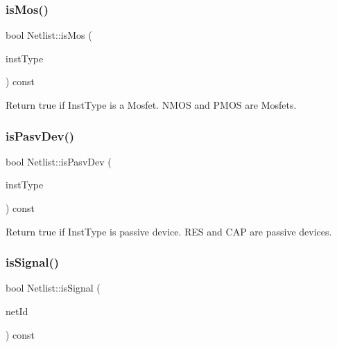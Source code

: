 \subsubsection{\texorpdfstring{is\+Mos()}{isMos()}}
{\footnotesize\ttfamily bool Netlist\+::is\+Mos (\begin{DoxyParamCaption}\item[{\hyperlink{type_8h_a53644c687d6bc203d9d3d3ee70075f61}{Inst\+Type}}]{inst\+Type }\end{DoxyParamCaption}) const}



Return true if Inst\+Type is a Mosfet. N\+M\+OS and P\+M\+OS are Mosfets. 

\mbox{\label{classNetlist_acb347983cc7dcfb9d40c2affe8442cb2}} 
\subsubsection{\texorpdfstring{is\+Pasv\+Dev()}{isPasvDev()}}
{\footnotesize\ttfamily bool Netlist\+::is\+Pasv\+Dev (\begin{DoxyParamCaption}\item[{\hyperlink{type_8h_a53644c687d6bc203d9d3d3ee70075f61}{Inst\+Type}}]{inst\+Type }\end{DoxyParamCaption}) const}



Return true if Inst\+Type is passive device. R\+ES and C\+AP are passive devices. 

\mbox{\label{classNetlist_ae518e05727e5cc449d728b43426e035d}} 
\subsubsection{\texorpdfstring{is\+Signal()}{isSignal()}}
{\footnotesize\ttfamily bool Netlist\+::is\+Signal (\begin{DoxyParamCaption}\item[{\hyperlink{type_8h_a581e8093e28e7362f2b6937296190676}{Index\+Type}}]{net\+Id }\end{DoxyParamCaption}) const\hspace{0.3cm}{\ttfamily [inline]}}



